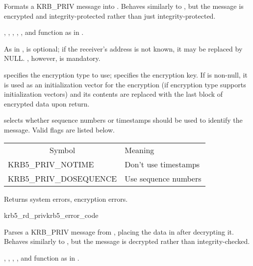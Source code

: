 Formats a KRB_PRIV message into .  Behaves similarly
to , but the message is encrypted and
integrity-protected rather than just integrity-protected.

, , ,
, ,  and
 function as in .

As in ,  is optional; if
the receiver's address is not known, it may be replaced by NULL.
, however, is mandatory.

 specifies the encryption type to use;
 specifies the encryption key.  If 
is non-null, it is used as an initialization vector for the encryption
(if encryption type  supports initialization vectors)
and its contents are replaced with the last block of encrypted data
upon return.

 selects whether sequence numbers or timestamps
should be used to identify the message.  Valid flags are listed below.

\begin{tabular}{ll}
\multicolumn{1}{c}{Symbol} & Meaning \\
KRB5_PRIV_NOTIME		& Don't use timestamps \\
KRB5_PRIV_DOSEQUENCE	& Use sequence numbers \\
\end{tabular}

Returns system errors, encryption errors.

\begin{funcdecl}{krb5_rd_priv}{krb5_error_code}{\funcin}
\funcinout
{}
\funcout
{}
\end{funcdecl}

Parses a KRB_PRIV message from , placing the data in
 after decrypting it.  Behaves similarly to
, but the message is decrypted rather than
integrity-checked.

, , ,
,  and 
function as in .


